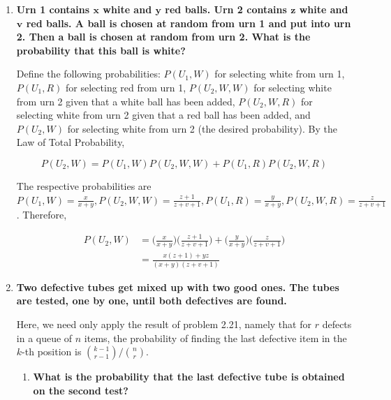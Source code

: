 \documentclass[10pt, oneside]{article}
\begin{document}
\begin{enumerate}[label=3.\arabic*]
\itemsep0em 
\item  \begin{tcolorbox}[
  colback=Cerulean!5!white,
  colframe=Cerulean!75!black]
\textbf{Urn 1 contains $\bm{x}$ white and $\bm{y}$ red balls. Urn 2 contains $\bm{z}$ white and $\bm{v}$ red balls. A ball is chosen at random from urn 1 and put into urn 2. Then a ball is chosen at random from urn 2. What is the probability that this ball is white?}
\end{tcolorbox}

Define the following probabilities: $P(U_1, W)$ for selecting white from urn 1, $P(U_1, R)$ for selecting red from urn 1, $P(U_2, W, W)$ for selecting white from urn 2 given that a white ball has been added, $P(U_2, W, R)$ for selecting white from urn 2 given that a red ball has been added, and $P(U_2, W)$ for selecting white from urn 2 (the desired probability). By the Law of Total Probability, 

\[ P(U_2, W) = P(U_1, W) P(U_2, W, W) + P(U_1, R) P(U_2, W, R) \]

The respective probabilities are $P(U_1, W) = \frac{x}{x+y},  P(U_2, W, W) = \frac{z+1}{z+v+1}, P(U_1, R) = \frac{y}{x+y}, P(U_2, W, R) = \frac{z}{z+v+1}$. Therefore,

\begin{align*}
P(U_2, W) &= \Bigg(  \frac{x}{x+y} \Bigg)  \Bigg( \frac{z+1}{z+v+1} \Bigg) + \Bigg( \frac{y}{x+y} \Bigg) \Bigg( \frac{z}{z+v+1} \Bigg) \\
&= \boxed{ \frac{x(z+1) + yz}{(x+y) (z+v+1)} }
\end{align*}

\item  \begin{tcolorbox}[
  colback=Cerulean!5!white,
  colframe=Cerulean!75!black]
\textbf{Two defective tubes get mixed up with two good ones. The tubes are tested, one by one, until both defectives are found.}
\end{tcolorbox}

Here, we need only apply the result of problem 2.21, namely that for $r$ defects in a queue of $n$ items, the probability of finding the last defective item in the $k$-th position is $\binom{k-1}{r-1} / \binom{n}{r}$.

	\begin{enumerate}
	\item  \begin{tcolorbox}[
	  colback=Cerulean!5!white,
	  colframe=Cerulean!75!black]
	\textbf{What is the probability that the last defective tube is obtained on the second test?}
	\end{tcolorbox}
	

\end{enumerate}
\end{enumerate}
\end{document}
